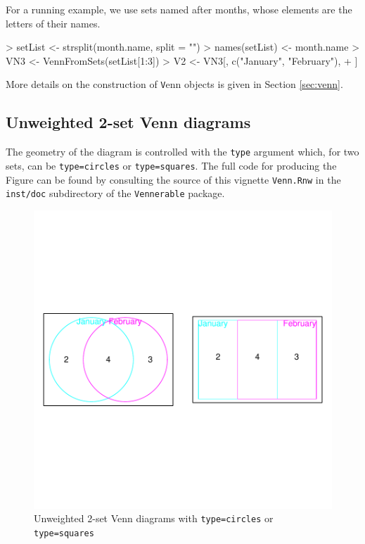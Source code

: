 \documentclass[a4paper]{article}
\begin{document}
For a running example, we use sets named after months,
whose elements are the letters of their names.
\begin{Schunk}
\begin{Sinput}
> setList <- strsplit(month.name, split = "")
> names(setList) <- month.name
> VN3 <- VennFromSets(setList[1:3])
> V2 <- VN3[, c("January", "February"), 
+     ]
\end{Sinput}
\end{Schunk}
More details on the construction of  {\texttt Venn} objects is given in Section \ref{sec:venn}.


\subsection{Unweighted 2-set Venn diagrams}

The geometry of the diagram is controlled with the \texttt{type} argument
which, for two sets, can be \texttt{type=circles} or \texttt{type=squares}.
The full code for producing the Figure
can be found by consulting the source of this vignette \texttt{Venn.Rnw}
in the \texttt{inst/doc} subdirectory of the \texttt{Vennerable} package.
 
\begin{figure}[H]\begin{center}

\includegraphics{Vennfig-pv2uwwww}
\caption{Unweighted 2-set Venn diagrams with \texttt{type=circles} or \texttt{type=squares}}
\end{center}\end{figure}
\end{document}
